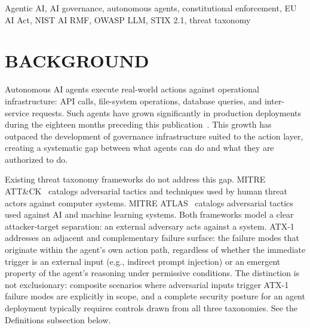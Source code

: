 \documentclass{IEEEoj-data}
\newcommand{\replaced}[2]{#1}
\newcommand{\added}[1]{#1}
\begin{document}
\begin{abstract}
{\textcolor{ieeedata}{\abstractheadfont\bfseries{DATA TYPE/LOCATION}}} Threat Taxonomy; Online (IEEE DataPort, Zenodo, aegis-governance.com)
\end{abstract}

\begin{IEEEkeywords}
Agentic AI, AI governance, autonomous agents, constitutional enforcement, EU AI Act, NIST AI RMF, OWASP LLM, STIX 2.1, threat taxonomy
\end{IEEEkeywords}

\maketitle

\section*{BACKGROUND}

\replaced{Autonomous AI agents execute real-world actions against operational infrastructure: API calls, file-system operations, database queries, and inter-service requests. Such agents have grown}{Autonomous AI agents---systems that execute real-world actions against operational infrastructure including API calls, file system operations, database queries, and inter-service requests---have grown} significantly in production deployments during the \replaced{eighteen}{twelve} months preceding this publication~\cite{ref1}. This growth has outpaced the development of governance infrastructure suited to the action layer, creating a systematic gap between what agents can do and what they are authorized to do.

Existing threat taxonomy frameworks do not address this gap. MITRE ATT\&CK~\cite{ref2} catalogs adversarial tactics and techniques used by human threat actors against computer systems. MITRE ATLAS~\cite{ref3} catalogs adversarial tactics used against AI and machine learning systems. Both frameworks model a clear attacker-target separation: an external adversary acts against a system. ATX-1 \replaced{addresses an adjacent and complementary failure surface: the failure modes that originate within the agent's own action path, regardless of whether the immediate trigger is an external input (e.g., indirect prompt injection) or an emergent property of the agent's reasoning under permissive conditions}{addresses the scenario where the AI agent itself is the threat source---not through compromise or malicious intent, but through capability without governance constraint}. \added{The distinction is not exclusionary: composite scenarios where adversarial inputs trigger ATX-1 failure modes are explicitly in scope, and a complete security posture for an agent deployment typically requires controls drawn from all three taxonomies. See the Definitions subsection below.}
\end{document}
